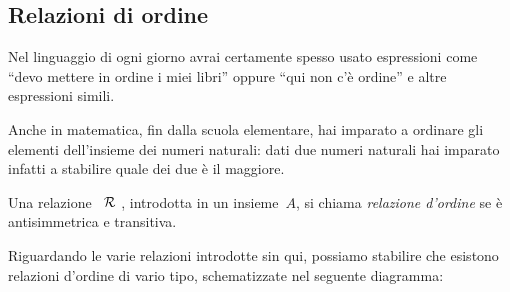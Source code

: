 \begin{comment}
\begin{definizione}
Si chiama \emph{insieme quoziente} di un insieme~\(A\) rispetto a una 
relazione 
di 
equivalenza~\(\srel\),
l'insieme i cui elementi sono le classi d'equivalenza determinate dalla 
relazione~\(\srel\). L'insieme quoziente si indica con il simbolo~\(A/\srel\).
\end{definizione}

Nel caso dell'esempio precedente si passa all'insieme quoziente~\(B/\srel\) 
del 
seguente diagramma di Eulero-Venn:
\begin{center}
 
\end{center}


\osservazione Ogni volta che si ha una relazione d'equivalenza~\(\srel\) in 
un 
insieme~\(A\), possiamo stabilire la seguente
catena di passaggi:
 \[\text{insieme }A\rightarrow\text{ partizione }P(A)\rightarrow\text{ 
insieme 
quoziente }A/\srel.\]

\ref{ese:B.39}, 


\end{comment}

\subsection{Relazioni di ordine}
\label{subsec:rel_ordine}

Nel linguaggio di ogni giorno avrai certamente spesso usato espressioni come 
``devo mettere in ordine i miei
libri'' oppure ``qui non c'è ordine'' e altre espressioni simili.

Anche in matematica, fin dalla scuola elementare, hai imparato a ordinare gli 
elementi dell'insieme dei
numeri naturali: dati due numeri naturali hai imparato infatti a stabilire 
quale 
dei due è il maggiore.

\begin{definizione}
Una relazione~\(~\mathcal{R}~\), introdotta in un insieme~\(A\), si chiama 
\emph{relazione 
d'ordine} se è antisimmetrica e transitiva.
\end{definizione}

Riguardando le varie relazioni introdotte sin qui, possiamo stabilire che 
esistono relazioni d'ordine di vario tipo, schematizzate nel seguente 
diagramma:
\begin{center}
 
\end{center}

